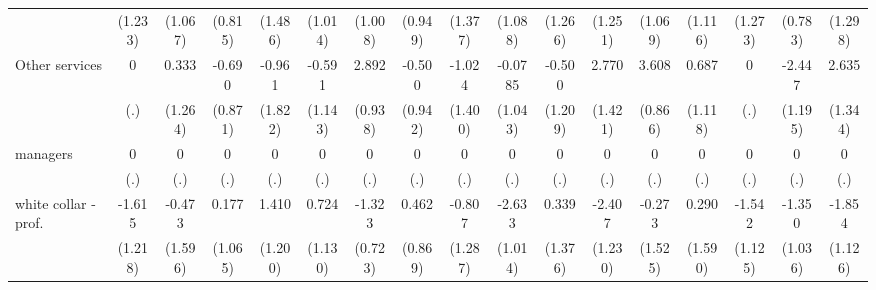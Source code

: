 {\begin{tabular}{l*{16}{c}}
                    &     (1.233)         &     (1.067)         &     (0.815)         &     (1.486)         &     (1.014)         &     (1.008)         &     (0.949)         &     (1.377)         &     (1.088)         &     (1.266)         &     (1.251)         &     (1.069)         &     (1.116)         &     (1.273)         &     (0.783)         &     (1.298)         \\
[1em]
Other services      &           0         &       0.333         &      -0.690         &      -0.961         &      -0.591         &       2.892\sym{**} &      -0.500         &      -1.024         &     -0.0785         &      -0.500         &       2.770         &       3.608\sym{***}&       0.687         &           0         &      -2.447\sym{*}  &       2.635\sym{*}  \\
                    &         (.)         &     (1.264)         &     (0.871)         &     (1.822)         &     (1.143)         &     (0.938)         &     (0.942)         &     (1.400)         &     (1.043)         &     (1.209)         &     (1.421)         &     (0.866)         &     (1.118)         &         (.)         &     (1.195)         &     (1.344)         \\
[1em]
managers            &           0         &           0         &           0         &           0         &           0         &           0         &           0         &           0         &           0         &           0         &           0         &           0         &           0         &           0         &           0         &           0         \\
                    &         (.)         &         (.)         &         (.)         &         (.)         &         (.)         &         (.)         &         (.)         &         (.)         &         (.)         &         (.)         &         (.)         &         (.)         &         (.)         &         (.)         &         (.)         &         (.)         \\
[1em]
white collar - prof.&      -1.615         &      -0.473         &       0.177         &       1.410         &       0.724         &      -1.323         &       0.462         &      -0.807         &      -2.633\sym{**} &       0.339         &      -2.407         &      -0.273         &       0.290         &      -1.542         &      -1.350         &      -1.854         \\
                    &     (1.218)         &     (1.596)         &     (1.065)         &     (1.200)         &     (1.130)         &     (0.723)         &     (0.869)         &     (1.287)         &     (1.014)         &     (1.376)         &     (1.230)         &     (1.525)         &     (1.590)         &     (1.125)         &     (1.036)         &     (1.126)         \\

\end{tabular}}

